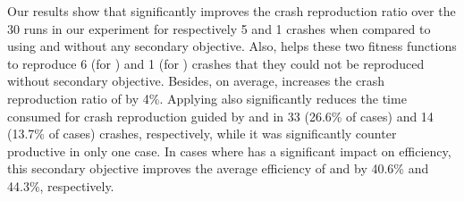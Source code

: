 Our results show that \bbc significantly improves the crash reproduction ratio over the 30 runs in our experiment for respectively 5 and 1 crashes when compared to using \integ and \WS without any secondary objective. Also, \bbc helps these two fitness functions to reproduce 6 (for \integ) and 1 (for \WS) crashes that they could not be reproduced without secondary objective. 
Besides, on average, \bbc increases the crash reproduction ratio of \integ by 4\%. 
Applying \bbc also significantly reduces the time consumed for crash reproduction guided by \integ and \WS in 33 (26.6\% of cases) and 14 (13.7\% of cases) crashes, respectively, while it was significantly counter productive in only one case. In cases where \bbc has a significant impact on efficiency, this secondary objective improves the average efficiency of \integ and \WS by 40.6\% and 44.3\%, respectively.
